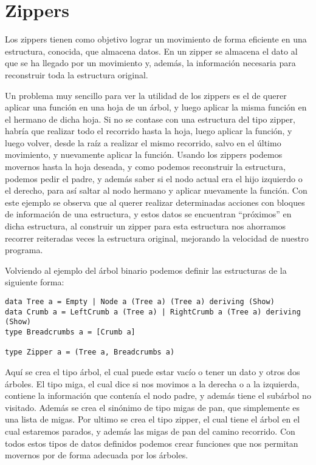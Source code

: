 \section{Zippers} %
\label{sec:zippers}

Los zippers tienen como objetivo lograr un movimiento de forma eficiente en una estructura, conocida, que almacena datos. En un zipper se almacena el dato al que se ha llegado por un movimiento y, además, la información necesaria para reconstruir toda la estructura original.

Un problema muy sencillo para ver la utilidad de los zippers es el de querer aplicar una función en una hoja de un árbol, y luego aplicar la misma función en el hermano de dicha hoja. Si no se contase con una estructura del tipo zipper, habría que realizar todo el recorrido hasta la hoja, luego aplicar la función, y luego volver, desde la raíz a realizar el mismo recorrido, salvo en el último movimiento, y nuevamente aplicar la función. Usando los zippers podemos movernos hasta la hoja deseada, y como podemos reconstruir la estructura, podemos pedir el padre, y además saber si el nodo actual era el hijo izquierdo o el derecho, para así saltar al nodo hermano y aplicar nuevamente la función.
Con este ejemplo se observa que al querer realizar determinadas acciones con bloques de información de una estructura, y estos datos se encuentran “próximos” en dicha estructura, al construir un zipper para esta estructura nos ahorramos recorrer reiteradas veces la estructura original, mejorando la velocidad de nuestro programa.

Volviendo al ejemplo del árbol binario podemos definir las estructuras de la siguiente forma:

\begin{lstlisting}
data Tree a = Empty | Node a (Tree a) (Tree a) deriving (Show)
data Crumb a = LeftCrumb a (Tree a) | RightCrumb a (Tree a) deriving (Show)
type Breadcrumbs a = [Crumb a]

type Zipper a = (Tree a, Breadcrumbs a)
\end{lstlisting}

Aquí se crea el tipo árbol, el cual puede estar vacío o tener un dato y otros dos árboles. El tipo miga, el cual dice si nos movimos a la derecha o a la izquierda, contiene la información que contenía el nodo padre, y además tiene el subárbol  no visitado. Además se crea el sinónimo de tipo migas de pan, que simplemente es una lista de migas. Por ultimo se crea el tipo zipper, el cual tiene el árbol en el cual estaremos parados, y además las migas de pan del camino recorrido.
Con todos estos tipos de datos definidos podemos crear funciones que nos permitan movernos por de forma adecuada por los árboles.

